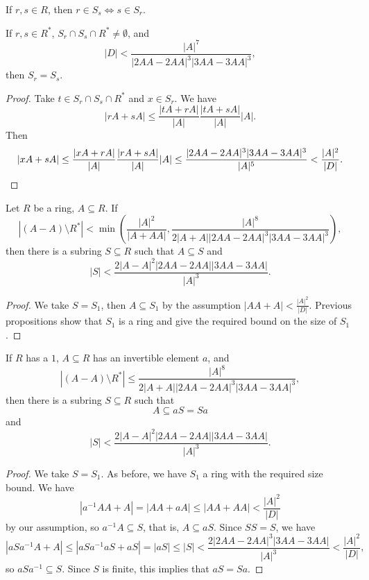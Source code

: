 \begin{prop} If $r,s \in R$, then $r \in S_s \iff s \in S_r$.
\end{prop}

\begin{prop} If $r,s \in R^*$, $S_r \cap S_s \cap R^* \ne \emptyset$, and
\[
|D| < \frac{|A|^7}{|2AA-2AA|^3|3AA-3AA|^3},
\]
then $S_r = S_s$.
\end{prop}
\begin{proof} Take $t \in S_r \cap S_s \cap R^*$ and $x \in S_r$. We have
\[
|rA+sA| \le \frac{|tA+rA|}{|A|}\frac{|tA+sA|}{|A|}|A|.
\]
Then
\[
|xA+sA| \le \frac{|xA+rA|}{|A|}\frac{|rA+sA|}{|A|}|A| \le \frac{|2AA-2AA|^3|3AA-3AA|^3}{|A|^5} < \frac{|A|^2}{|D|}.\qedhere
\]
\end{proof}

\begin{thm} Let $R$ be a ring, $A \subseteq R$. If
\[
|(A-A)\setminus R^*| < \min\left(\frac{|A|^2}{|A+AA|}, \frac{|A|^8}{2|A+A||2AA-2AA|^3|3AA-3AA|^3}\right),
\]
then there is a subring $S \subseteq R$ such that $A \subseteq S$ and
\[
|S| < \frac{2|A-A|^2|2AA-2AA||3AA-3AA|}{|A|^3}.
\]
\end{thm}
\begin{proof} We take $S = S_1$, then $A \subseteq S_1$ by the assumption $|AA+A| < \frac{|A|^2}{|D|}$. Previous propositions show that $S_1$ is a ring and give the required bound on the size of $S_1$.
\end{proof}

\begin{thm} If $R$ has a $1$, $A \subseteq R$ has an invertible element $a$, and
\[
|(A-A)\setminus R^*| \le \frac{|A|^8}{2|A+A||2AA-2AA|^3|3AA-3AA|^3},
\]
then there is a subring $S \subseteq R$ such that
\[
A \subseteq aS = Sa
\]
and
\[
|S| < \frac{2|A-A|^2|2AA-2AA||3AA-3AA|}{|A|^3}.
\]
\end{thm}
\begin{proof} We take $S = S_1$. As before, we have $S_1$ a ring with the required size bound. We have
\[
|a^{-1}AA+A| = |AA+aA| \le |AA+AA| < \frac{|A|^2}{|D|}
\]
by our assumption, so $a^{-1}A \subseteq S$, that is, $A \subseteq aS$. Since $SS = S$, we have
\[
|aSa^{-1}A+A| \le |aSa^{-1}aS+aS| = |aS| \le |S| < \frac{2|2AA-2AA|^3|3AA-3AA|}{|A|^3} < \frac{|A|^2}{|D|},
\]
so $aSa^{-1} \subseteq S$. Since $S$ is finite, this implies that $aS = Sa$.
\end{proof}


\nocite{big-garaev}
\nocite{bourgain-arbitrary}
\nocite{complex}
\nocite{garaev}
\nocite{kollar}
\nocite{petridis}
\nocite{point-plane}
\nocite{point-plane-app}
\nocite{schoen}
\nocite{slight}
\nocite{solymosi}
\nocite{ruzsa}
\nocite{tao}
%
%

%


